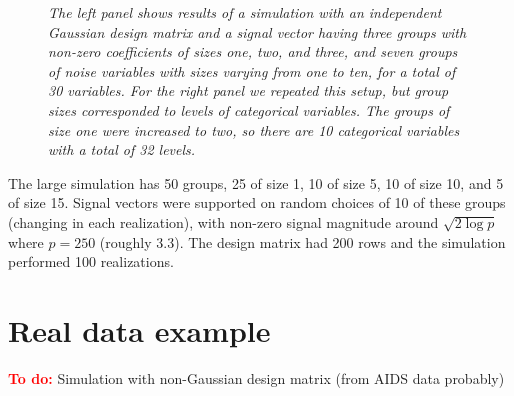 \documentclass{imsart}
\newcommand{\todo}{\textcolor{red}{\textbf{To do: }}}
\begin{document}
\begin{figure}
\begin{center}
\hspace{-15pt}
\caption{\small \it The left panel shows results of a simulation with
  an independent Gaussian design matrix and a signal vector having
  three groups with non-zero coefficients of sizes one, two, and
  three, and seven groups of noise variables with sizes varying from
  one to ten, for a total of 30 variables. For the right panel we
  repeated this setup, but group sizes corresponded to levels of
  categorical variables. The groups of size one were increased to two,
so there are 10 categorical variables with a total of 32 levels.}
\end{center}
\end{figure}



The large simulation has 50 groups, 25 of size 1, 10 of size 5, 10 of
size 10, and 5 of size 15. Signal vectors were supported on random
choices of 10 of these groups (changing in each realization), with
non-zero signal magnitude around $\sqrt{2\log p}$ where $p = 250$
(roughly 3.3). The design matrix had 200 rows and the simulation
performed 100 realizations.



\section{Real data example}
\todo Simulation with non-Gaussian design matrix (from AIDS data probably)
\end{document}
